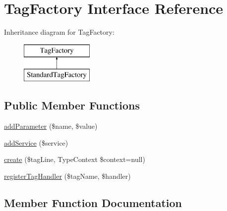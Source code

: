 \hypertarget{interfacephp_documentor_1_1_reflection_1_1_doc_block_1_1_tag_factory}{}\section{Tag\+Factory Interface Reference}
\label{interfacephp_documentor_1_1_reflection_1_1_doc_block_1_1_tag_factory}
Inheritance diagram for Tag\+Factory\+:\begin{figure}[H]
\begin{center}
\leavevmode
\includegraphics[height=2.000000cm]{interfacephp_documentor_1_1_reflection_1_1_doc_block_1_1_tag_factory}
\end{center}
\end{figure}
\subsection*{Public Member Functions}
\begin{DoxyCompactItemize}
\item 
\mbox{\hyperlink{interfacephp_documentor_1_1_reflection_1_1_doc_block_1_1_tag_factory_a866abdd2dc807cd23873af01cb41f4c6}{add\+Parameter}} (\$name, \$value)
\item 
\mbox{\hyperlink{interfacephp_documentor_1_1_reflection_1_1_doc_block_1_1_tag_factory_ab7aabcd2f0ab70d9ee3f6cc9ee1441d7}{add\+Service}} (\$service)
\item 
\mbox{\hyperlink{interfacephp_documentor_1_1_reflection_1_1_doc_block_1_1_tag_factory_a0daeb138405d397a02abe57bc3e6a274}{create}} (\$tag\+Line, Type\+Context \$context=null)
\item 
\mbox{\hyperlink{interfacephp_documentor_1_1_reflection_1_1_doc_block_1_1_tag_factory_ab57c71828fcf271fc43f9422ca1163d2}{register\+Tag\+Handler}} (\$tag\+Name, \$handler)
\end{DoxyCompactItemize}


\subsection{Member Function Documentation}
\mbox{\label{interfacephp_documentor_1_1_reflection_1_1_doc_block_1_1_tag_factory_a866abdd2dc807cd23873af01cb41f4c6}} 
